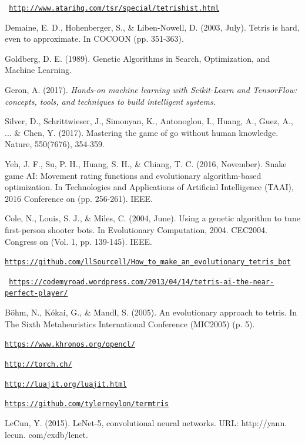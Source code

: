 \documentclass[conference]{IEEEtran}
\begin{document}
\begin{thebibliography}{00}

 \texttt{ \url{http://www.atarihq.com/tsr/special/tetrishist.html}}

 Demaine, E. D., Hohenberger, S., \& Liben-Nowell, D. (2003, July). Tetris is hard, even to approximate. In COCOON (pp. 351-363).

 Goldberg, D. E. (1989). Genetic Algorithms in Search, Optimization, and Machine Learning.

  Geron, A. (2017). \textit{Hands-on machine learning with Scikit-Learn and TensorFlow: concepts, tools, and techniques to build intelligent systems.}

 Silver, D., Schrittwieser, J., Simonyan, K., Antonoglou, I., Huang, A., Guez, A., ... \& Chen, Y. (2017). Mastering the game of go without human knowledge. Nature, 550(7676), 354-359.

 Yeh, J. F., Su, P. H., Huang, S. H., \& Chiang, T. C. (2016, November). Snake game AI: Movement rating functions and evolutionary algorithm-based optimization. In Technologies and Applications of Artificial Intelligence (TAAI), 2016 Conference on (pp. 256-261). IEEE.

 Cole, N., Louis, S. J., \& Miles, C. (2004, June). Using a genetic algorithm to tune first-person shooter bots. In Evolutionary Computation, 2004. CEC2004. Congress on (Vol. 1, pp. 139-145). IEEE.

 \texttt{\url{https://github.com/llSourcell/How_to_make_an_evolutionary_tetris_bot}}

 \texttt{ \url{https://codemyroad.wordpress.com/2013/04/14/tetris-ai-the-near-perfect-player/}}

 Böhm, N., Kókai, G., \& Mandl, S. (2005). An evolutionary approach to tetris. In The Sixth Metaheuristics International Conference (MIC2005) (p. 5).

 \texttt{\url{https://www.khronos.org/opencl/}}

 \texttt{\url{http://torch.ch/}}

 \texttt{\url{http://luajit.org/luajit.html}}

 \texttt{\url{https://github.com/tylerneylon/termtris}}

 LeCun, Y. (2015). LeNet-5, convolutional neural networks. URL: http://yann. lecun. com/exdb/lenet.

\end{thebibliography}
\end{document}
